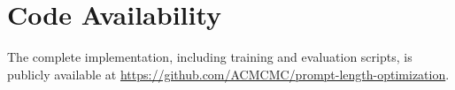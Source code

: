 \documentclass[11pt]{article}
\begin{document}



\section{Code Availability}
\label{app:code}

The complete implementation, including training and evaluation scripts, is publicly available at \url{https://github.com/ACMCMC/prompt-length-optimization}.
\end{document}
